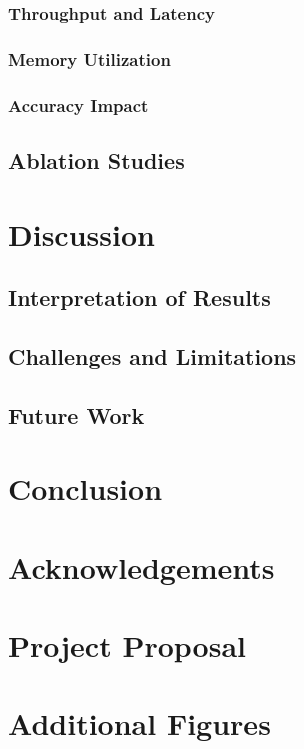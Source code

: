 \documentclass[11pt]{article}
\begin{document}
  \subsubsection{Throughput and Latency}
  \subsubsection{Memory Utilization}
  \subsubsection{Accuracy Impact}

  \subsection{Ablation Studies}

\section{Discussion}
  \subsection{Interpretation of Results}
  \subsection{Challenges and Limitations}
  \subsection{Future Work}

\section{Conclusion}

\section*{Acknowledgements}

\appendix
\section{Project Proposal}

\section{Additional Figures}


\end{document}
